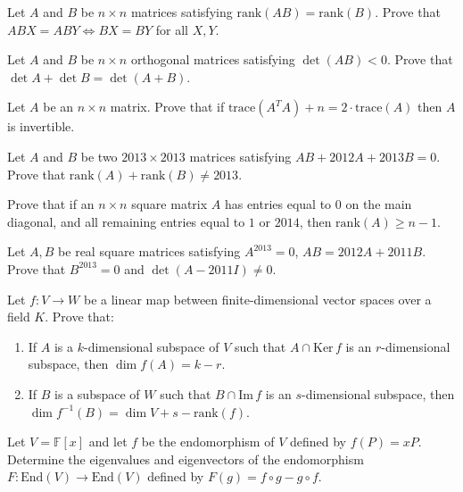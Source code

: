\documentclass[12pt]{article}
\begin{document}
\begin{problem}
Let $A$ and $B$ be $n\times n$ matrices satisfying $\mathrm{rank}(AB)=\mathrm{rank}(B)$. Prove that $ABX=ABY \iff BX=BY$ for all $X,Y$.
\end{problem}

\begin{problem}
Let $A$ and $B$ be $n\times n$ orthogonal matrices satisfying $\det(AB)<0$. Prove that $\det A + \det B = \det(A+B)$.
\end{problem}

\begin{problem}
Let $A$ be an $n\times n$ matrix. Prove that if $\mathrm{trace}(A^TA)+n = 2\cdot\mathrm{trace}(A)$ then $A$ is invertible.
\end{problem}

\begin{problem}
Let $A$ and $B$ be two $2013\times 2013$ matrices satisfying $AB+2012A+2013B=0$. Prove that $\mathrm{rank}(A)+\mathrm{rank}(B) \neq 2013$.
\end{problem}

\begin{problem}
Prove that if an $n\times n$ square matrix $A$ has entries equal to $0$ on the main diagonal, and all remaining entries equal to $1$ or $2014$, then $\mathrm{rank}(A) \geq n-1$.
\end{problem}

\begin{problem}
Let $A,B$ be real square matrices satisfying $A^{2013}=0$, $AB=2012A+2011B$. Prove that $B^{2013}=0$ and $\det(A-2011I)\neq 0$.
\end{problem}

\begin{problem}
Let $f:V\to W$ be a linear map between finite-dimensional vector spaces over a field $K$. Prove that:
\begin{enumerate}[label=\arabic*.]
\item If $A$ is a $k$-dimensional subspace of $V$ such that $A\cap\mathrm{Ker}\,f$ is an $r$-dimensional subspace, then $\dim f(A) = k-r$.
\item If $B$ is a subspace of $W$ such that $B\cap \mathrm{Im}\,f$ is an $s$-dimensional subspace, then $\dim f^{-1}(B) = \dim V + s - \mathrm{rank}(f)$.
\end{enumerate}
\end{problem}

\begin{problem}
Let $V=\mathbb{F}[x]$ and let $f$ be the endomorphism of $V$ defined by $f(P)=xP$. Determine the eigenvalues and eigenvectors of the endomorphism $F:\mathrm{End}(V)\to\mathrm{End}(V)$ defined by $F(g)=f\circ g - g\circ f$.
\end{problem}
\end{document}
